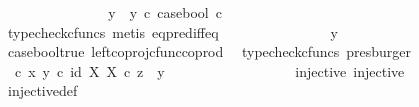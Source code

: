\begin{isabellebody}
\ \ \ \ \ \ \ \ \ \ \isamarkupfalse%
\ \isamarkupfalse%
\ {\isachardoublequoteopen}{\isachardot}{\kern0pt}{\isachardot}{\kern0pt}{\isachardot}{\kern0pt}\ {\isacharequal}{\kern0pt}\ {\isacharparenleft}{\kern0pt}y{}\ {\isasymamalg}\ y{}{\isacharparenright}{\kern0pt}\ {\isasymcirc}\isactrlsub c\ case{\isacharunderscore}{\kern0pt}bool\ {\isasymcirc}\isactrlsub c\ {\isasymt}{\isachardoublequoteclose}\isanewline
\ \ \ \ \ \ \ \ \ \ \ \ \isamarkupfalse%
\ {\isacharparenleft}{\kern0pt}typecheck{\isacharunderscore}{\kern0pt}cfuncs{\isacharcomma}{\kern0pt}\ metis\ eq{\isacharunderscore}{\kern0pt}pred{\isacharunderscore}{\kern0pt}iff{\isacharunderscore}{\kern0pt}eq{\isacharparenright}{\kern0pt}\isanewline
\ \ \ \ \ \ \ \ \ \ \isamarkupfalse%
\ \isamarkupfalse%
\ {\isachardoublequoteopen}{\isachardot}{\kern0pt}{\isachardot}{\kern0pt}{\isachardot}{\kern0pt}\ {\isacharequal}{\kern0pt}\ y{}{\isachardoublequoteclose}\isanewline
\ \ \ \ \ \ \ \ \ \ \ \ \isamarkupfalse%
\ case{\isacharunderscore}{\kern0pt}bool{\isacharunderscore}{\kern0pt}true\ left{\isacharunderscore}{\kern0pt}coproj{\isacharunderscore}{\kern0pt}cfunc{\isacharunderscore}{\kern0pt}coprod\ \isamarkupfalse%
\ {\isacharparenleft}{\kern0pt}typecheck{\isacharunderscore}{\kern0pt}cfuncs{\isacharcomma}{\kern0pt}\ presburger{\isacharparenright}{\kern0pt}\isanewline
\ \ \ \ \ \ \ \ \ \ \isamarkupfalse%
\ \isamarkupfalse%
\ {\isachardoublequoteopen}{\isacharparenleft}{\kern0pt}{\isasymTheta}\ {\isasymcirc}\isactrlsub c\ {\isasymlangle}x{\isacharcomma}{\kern0pt}\ y{}{\isasymrangle}{\isacharparenright}{\kern0pt}\isactrlsup {\isasymflat}\ {\isasymcirc}\isactrlsub c\ {\isasymlangle}id\ X{\isacharcomma}{\kern0pt}\ {\isasymbeta}\isactrlbsub X\isactrlesub {\isasymrangle}\ {\isasymcirc}\isactrlsub c\ z\ {\isacharequal}{\kern0pt}\ y{}{\isachardoublequoteclose}\isacommand{{\isachardot}{\kern0pt}}\isamarkupfalse%
\isanewline
\ \ \ \ \ \ \ \ \isamarkupfalse%
\isanewline
\ \ \isanewline
\ \ \ \ \ \isamarkupfalse%
\ {\isasymTheta}{\isacharunderscore}{\kern0pt}injective{\isacharcolon}{\kern0pt}\ {\isachardoublequoteopen}injective{\isacharparenleft}{\kern0pt}{\isasymTheta}{\isacharparenright}{\kern0pt}{\isachardoublequoteclose}\isanewline
\ \ \ \ \ \ \ \isamarkupfalse%
\ injective{\isacharunderscore}{\kern0pt}def\isanewline
\ \ \ \ \ \isamarkupfalse%

\end{isabellebody}
